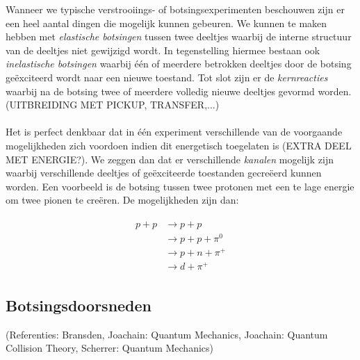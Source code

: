 \documentclass[11pt]{article}
\numberwithin{equation}{section}
\begin{document}
Wanneer we typische verstrooiings- of botsingsexperimenten beschouwen zijn er een heel aantal dingen die mogelijk kunnen gebeuren. We kunnen te maken hebben met \emph{elastische botsingen} tussen twee deeltjes waarbij de interne structuur van de deeltjes niet gewijzigd wordt. In tegenstelling hiermee bestaan ook \emph{inelastische botsingen} waarbij \'e\'en of meerdere betrokken deeltjes door de botsing ge\"exciteerd wordt naar een nieuwe toestand. Tot slot zijn er de \emph{kernreacties} waarbij na de botsing twee of meerdere volledig nieuwe deeltjes gevormd worden. (UITBREIDING MET PICKUP, TRANSFER,...)\\
\\
Het is perfect denkbaar dat in \'e\'en experiment verschillende van de voorgaande mogelijkheden zich voordoen indien dit energetisch toegelaten is (EXTRA DEEL MET ENERGIE?). We zeggen dan dat er verschillende \emph{kanalen} mogelijk zijn waarbij verschillende deeltjes of ge\"exciteerde toestanden gecre\"eerd kunnen worden. Een voorbeeld is de botsing tussen twee protonen met een te lage energie om twee pionen te cre\"eren. De mogelijkheden zijn dan:

\begin{align}
\begin{split}
p + p &\rightarrow p + p \\
&\rightarrow p + p + \pi^0\\
&\rightarrow p + n + \pi^+\\
&\rightarrow d + \pi^+
\end{split}
\end{align}




\subsection{Botsingsdoorsneden}\label{sec:Botsingsdoorsneden}

(Referenties: Bransden, Joachain: Quantum Mechanics, Joachain: Quantum Collision Theory, Scherrer: Quantum Mechanics)\\
\\
\end{document}
